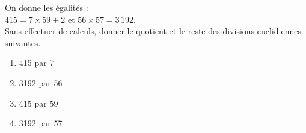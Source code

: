 \begin{exercice*}
   On donne les égalités : \\
   $415 = 7\times59+2$ et $56\times57 = 3\,192$. \\
   Sans effectuer de calculs, donner le quotient et le reste des divisions euclidiennes suivantes.
   \begin{multicols}{2}
   \begin{enumerate}
      \item 415 par 7
      \item \num{3192} par 56
      \item 415 par 59
      \item \num{3192} par 57
   \end{enumerate}
   \end{multicols}
\end{exercice*}
